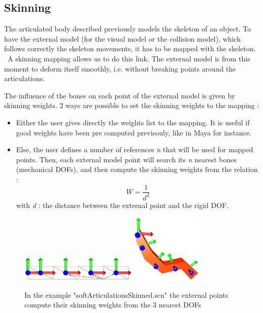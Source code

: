\subsection{Skinning}

The articulated body described previously models the skeleton of an object.
To have the external model (for the visual model or the collision model), which follows correctly the skeleton movements, it has to be mapped with the skeleton. 
\ 
A skinning mapping allows us to do this link. The external model is from this moment to deform itself smoothly, i.e. without breaking points around the articulations.

The influence of the bones on each point of the external model is given by skinning weights.
2 ways are possible to set the skinning weights to the mapping :
\begin{itemize}
	\item Either the user gives directly the weights list to the mapping. It is useful if good weights have been pre computed previsouly, like in Maya for instance.
	\item Else, the user defines a number of references \textsl{n} that will be used for mapped points. Then, each external model point will search its \textsl{n} nearest bones (mechanical DOFs), and then compute the skinning weights from the relation :
\[ W = \frac{1}{d^{2}}  \]
\small{ with \textsl{d} : the distance between the external point and the rigid DOF.}
\end{itemize}

\begin{figure}[htpb]
		\centering
		\includegraphics[width=0.50\textwidth]{skinning}
		\includegraphics[width=0.30\textwidth]{skinnedPendulum}	
	\caption{In the example "softArticulationsSkinned.scn" the external points compute their skinning weights from the 3 nearest DOFs}
\end{figure}
